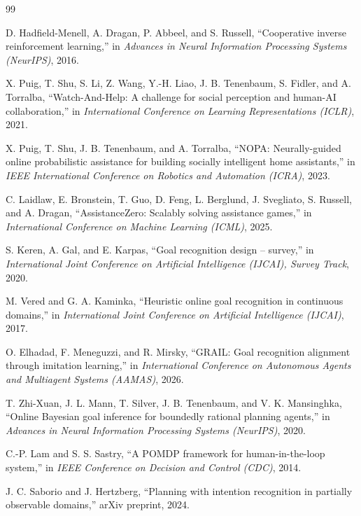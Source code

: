 \documentclass[12pt]{article}
\begin{document}
\begin{thebibliography}{99}
\setlength{\itemsep}{2pt}

 D. Hadfield-Menell, A. Dragan, P. Abbeel, and S. Russell,
``Cooperative inverse reinforcement learning,'' in \emph{Advances in Neural
Information Processing Systems (NeurIPS)}, 2016.

 X. Puig, T. Shu, S. Li, Z. Wang, Y.-H. Liao, J. B. Tenenbaum,
S. Fidler, and A. Torralba, ``Watch-And-Help: A challenge for social perception
and human-AI collaboration,'' in \emph{International Conference on Learning
Representations (ICLR)}, 2021.

 X. Puig, T. Shu, J. B. Tenenbaum, and A. Torralba, ``NOPA:
Neurally-guided online probabilistic assistance for building socially
intelligent home assistants,'' in \emph{IEEE International Conference on
Robotics and Automation (ICRA)}, 2023.

 C. Laidlaw, E. Bronstein, T. Guo, D. Feng,
L. Berglund, J. Svegliato, S. Russell, and A. Dragan, ``AssistanceZero:
Scalably solving assistance games,'' in \emph{International Conference on
Machine Learning (ICML)}, 2025.

 S. Keren, A. Gal, and E. Karpas, ``Goal recognition
design -- survey,'' in \emph{International Joint Conference on Artificial
Intelligence (IJCAI), Survey Track}, 2020.

 M. Vered and G. A. Kaminka, ``Heuristic online goal recognition
in continuous domains,'' in \emph{International Joint Conference on Artificial
Intelligence (IJCAI)}, 2017.

 O. Elhadad, F. Meneguzzi, and R. Mirsky, ``GRAIL: Goal
recognition alignment through imitation learning,'' in \emph{International
Conference on Autonomous Agents and Multiagent Systems (AAMAS)}, 2026.

 T. Zhi-Xuan, J. L. Mann, T. Silver, J. B. Tenenbaum, and
V. K. Mansinghka, ``Online Bayesian goal inference for boundedly rational
planning agents,'' in \emph{Advances in Neural Information Processing Systems
(NeurIPS)}, 2020.

 C.-P. Lam and S. S. Sastry, ``A POMDP framework for
human-in-the-loop system,'' in \emph{IEEE Conference on Decision and Control
(CDC)}, 2014.

 J. C. Saborio and J. Hertzberg, ``Planning with intention
recognition in partially observable domains,'' arXiv preprint, 2024.


\end{thebibliography}
\end{document}
